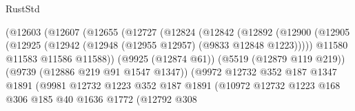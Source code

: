 \begin{lexlean}{RustStd}
\begin{coremodule}
                                    (@12603
                                      (@12607
                                        (@12655
                                          (@12727
                                            (@12824
                                              (@12842
                                                (@12892
                                                  (@12900
                                                    (@12905
                                                      (@12925
                                                        (@12942
                                                          (@12948
                                                            (@12955 @12957)
                                                            (@9833 @12848 @1223)))))
                                                    @11580
                                                    @11583
                                                    @11586
                                                    @11588))
                                                (@9925 (@12874 @61))
                                                (@5519 (@12879 @119 @219))
                                                (@9739 (@12886 @219 @91 @1547 @1347))
                                                (@9972
                                                  @12732
                                                  @352
                                                  @187
                                                  @1347
                                                  @1891
                                                  (@9981
                                                    @12732
                                                    @1223
                                                    @352
                                                    @187
                                                    @1891
                                                    (@10972
                                                      @12732
                                                      @1223
                                                      @168
                                                      @306
                                                      @185
                                                      @40
                                                      @1636
                                                      @1772
                                                      (@12792
                                                        @308

\end{coremodule}
\end{lexlean}
